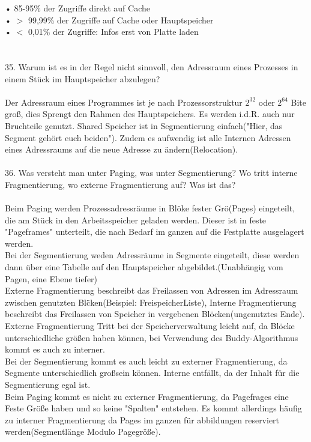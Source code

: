 \documentclass{article}
\begin{document}
• 85-95\% der Zugriffe direkt auf Cache\\
• $>$ 99,99\% der Zugriffe auf Cache oder Hauptspeicher\\
• $<$ 0,01\% der Zugriffe: Infos erst von Platte laden\\
\\
\\
35. Warum ist es in der Regel nicht sinnvoll, den Adressraum eines Prozesses in einem Stück
im Hauptspeicher abzulegen?
\\
\\
Der Adressraum eines Programmes ist je nach Prozessorstruktur $2^32$ oder $2^64$ Bite gro\ss, dies Sprengt den Rahmen des Hauptspeichers. Es werden i.d.R. auch nur Bruchteile genutzt. Shared Speicher ist in Segmentierung einfach("Hier, das Segment geh\"ort euch beiden"). Zudem es aufwendig ist alle Internen Adressen eines Adressraums auf die neue Adresse zu \"andern(Relocation).
\\
\\
36. Was versteht man unter Paging, was unter Segmentierung? Wo tritt interne Fragmentierung,
wo externe Fragmentierung auf? Was ist das?
\\
\\
Beim Paging werden Prozessadressr\"aume in Bl\"oke fester Gr\"o\sse(Pages) eingeteilt, die am St\"uck in den Arbeitsspeicher geladen werden. Dieser ist in feste "Pageframes" unterteilt, die nach Bedarf im ganzen auf die Festplatte ausgelagert werden.\\
Bei der Segmentierung weden Adressr\"aume in Segmente eingeteilt, diese werden dann \"uber eine Tabelle auf den Hauptspeicher abgebildet.(Unabh\"angig vom Pagen, eine Ebene tiefer)\\
Externe Fragmentierung beschreibt das Freilassen von Adressen im Adressraum zwischen genutzten Bl\"cken(Beispiel: FreispeicherListe), Interne Fragmentierung beschreibt das Freilassen von Speicher in vergebenen Bl\"ocken(ungenutztes Ende).
Externe Fragmentierung Tritt bei der Speicherverwaltung leicht auf, da Bl\"ocke unterschiedliche gr\"o\ss en haben k\"onnen, bei Verwendung des Buddy-Algorithmus kommt es auch zu interner.\\
Bei der Segmentierung kommt es auch leicht zu externer Fragmentierung, da Segmente unterschiedlich gro\ss sein k\"onnen. Interne entf\"allt, da der Inhalt f\"ur die Segmentierung egal ist.\\
Beim Paging kommt es nicht zu externer Fragmentierung, da Pagefrages eine Feste Gr\"o\ss e haben und so keine "Spalten" entstehen. Es kommt allerdings h\"aufig zu interner Fragmentierung da Pages im ganzen f\"ur abbildungen reserviert werden(Segmentl\"ange Modulo Pagegr\"o\ss e).
\end{document}
